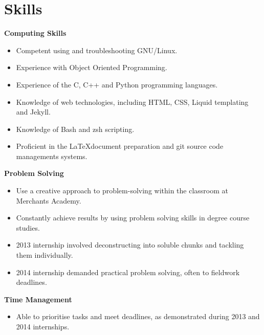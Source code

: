 \documentclass[11pt,a4paper,sans]{moderncv}
\begin{document}
\vspace{2pt}

\newpage

\section{Skills}

{\large\textbf{Computing Skills}}

\begin{itemize}
\item Competent using and troubleshooting GNU/Linux.
\item Experience with Object Oriented Programming.
\item Experience of the C, C++ and Python programming languages.
\item Knowledge of web technologies, including HTML, CSS, Liquid templating and
    Jekyll.
\item Knowledge of Bash and zsh scripting.
\item Proficient in the \LaTeX \space document preparation and git source
    code managements systems.
\end{itemize}

\vspace{1em}

{\large\textbf{Problem Solving}}

\begin{itemize}
\item Use a creative approach to problem-solving within the classroom
    at Merchants Academy.
\item Constantly achieve results by using problem solving skills in degree
    course studies.
\item 2013 internship involved deconstructing into soluble
    chunks and tackling them individually.
\item 2014 internship demanded practical problem solving, often to fieldwork
    deadlines.
\end{itemize}

\vspace{1em}

{\large\textbf{Time Management}}

\begin{itemize}
\item Able to prioritise tasks and meet deadlines, as demonstrated during 2013
    and 2014 internships.
\end{itemize}
\end{document}
